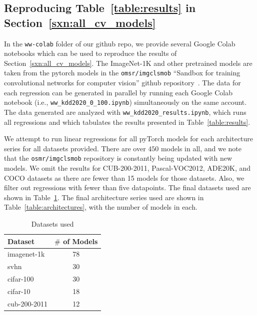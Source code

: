 \subsection{Reproducing Table~\ref{table:results} in Section~\ref{sxn:all_cv_models} }

In the \texttt{ww-colab} folder of our github repo, we provide several Google Colab notebooks which can be used to reproduce the results of Section~\ref{sxn:all_cv_models}.
The ImageNet-1K and other pretrained models are taken from the pytorch models in the \texttt{omsr/imgclsmob} 
``Sandbox for training convolutional networks for computer vision'' github repository~\cite{osmr}.
The data for each regression can be generated in parallel by running each Google Colab notebook (i.e., \texttt{ww\_kdd2020\_0\_100.ipynb}) simultaneously on the same account.
The data generated are analyzed with \texttt{ww\_kdd2020\_results.ipynb}, which runs all regressions and which tabulates the results presented in Table~\ref{table:results}.

We attempt to run linear regressions for all pyTorch models for each architecture series for all datasets provided.  
There are over $450$ models in all, and we note that the \texttt{osmr/imgclsmob} repository is constantly being updated with new models.
We omit the results for CUB-200-2011, Pascal-VOC2012, ADE20K, and COCO datasets as there are fewer than 15 models for those datasets.  
Also, we filter out regressions with fewer than five datapoints.
The final datasets used are shown in Table~\ref{table:datasets}.
The final architecture series used are shown in  Table~\ref{table:architectures}, with the number of models in each.

\begin{table}[t]
\small
\begin{center}
\begin{tabular}{|p{1in}|c|}
\hline
Dataset & $\#$ of Models \\
\hline
imagenet-1k   &  78 \\
svhn          &  30 \\
cifar-100     &  30 \\
cifar-10      &  18 \\
cub-200-2011  &  12 \\
\hline
\end{tabular}
\end{center}
\caption{Datasets used}
\label{table:datasets}
\end{table}

